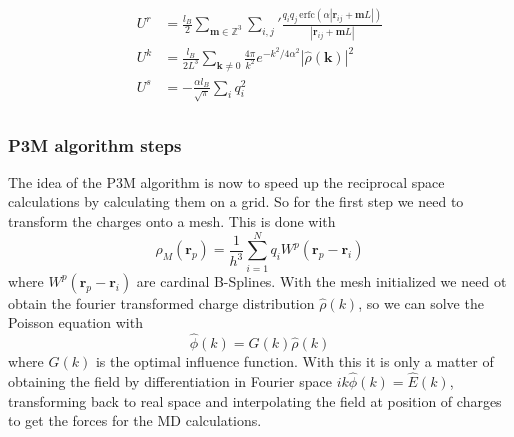 \begin{align*}
  U^{r} &= \frac{l_B}{2} \sum_{\mathbf{m} \in \mathbb{Z}^3} \sum_{i,j}' \frac{q_i q_j \, \text{erfc}(\alpha | \mathbf{r}_{ij} + \mathbf{m}L |)}{| \mathbf{r}_{ij} + \mathbf{m}L |}  \\
  U^{k} &= \frac{l_B}{2L^3} \sum_{\mathbf{k} \neq 0} \frac{4\pi}{k^2} e^{-k^2 / 4\alpha^2} |\hat{\rho}(\mathbf{k})|^2 \\
  U^{s} &= -\frac{\alpha l_B}{\sqrt{\pi}} \sum_{i} q_i^2\\
\end{align*}

\subsubsection{P3M algorithm steps}
The idea of the P3M algorithm is now to speed up the reciprocal space calculations by calculating them on a grid.
So for the first step we need to transform the charges onto a mesh. 
This is done with 
\begin{equation}
  \rho_M(\mathbf{r}_p) = \frac{1}{h^3} \sum_{i=1}^{N} q_i W^{p}(\mathbf{r}_p - \mathbf{r}_i)
\end{equation}
where $W^{p}(\mathbf{r}_p - \mathbf{r}_i)$ are cardinal B-Splines.
With the mesh initialized we need ot obtain the fourier transformed charge distribution $\hat{\rho}(k)$, so we can solve the Poisson equation with
\begin{equation}
  \hat{\phi}(k) = G(k)\hat{\rho}(k)
\end{equation}
where $G(k)$ is the optimal influence function.
With this it is only a matter of obtaining the field by differentiation in Fourier space $ik\hat{\phi}(k) = \hat{E}(k)$, transforming back to real space  and interpolating the field at position of charges to get the forces for the MD calculations. 
